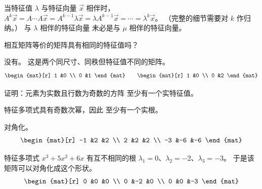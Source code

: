     \begin{answer}
      \begin{exparts}
        \partsitem 当特征值 $\lambda$ 与特征向量 $\vec{x}$ 相伴时，
          $A^k\vec{x}=A\cdots A\vec{x}=A^{k-1}\lambda\vec{x}
            =\lambda A^{k-1}\vec{x}=\cdots=\lambda^k\vec{x}$。
          （完整的细节需要对 $k$ 作归纳。）
        \partsitem 与 $\lambda$ 相伴的特征向量
          未必是与 $\mu$ 相伴的特征向量。
      \end{exparts}
    \end{answer}
  \item 
    相互矩阵等价的矩阵具有相同的特征值吗？
    \begin{answer}
      没有。
      这是两个同尺寸、同秩但特征值不同的矩阵。
      \begin{equation*}
        \begin{mat}[r]
          1  &0  \\
          0  &1
        \end{mat}
        \qquad
        \begin{mat}[r]
          1  &0  \\
          0  &2
        \end{mat}
      \end{equation*}
    \end{answer}
  \item 
    证明：元素为实数且行数为奇数的方阵
    至少有一个实特征值。
    \begin{answer}
      特征多项式具有奇数次幂，因此
      至少有一个实根。
    \end{answer}
  \item 
    对角化。
    \begin{equation*}
       \begin{mat}[r]
         -1  &2  &2  \\
          2  &2  &2  \\
         -3  &-6 &-6
       \end{mat}
    \end{equation*}
    \begin{answer}
      特征多项式 $x^3+5x^2+6x$ 有互不相同的根
      \( \lambda_1=0 \)、\( \lambda_2=-2 \)、\( \lambda_3=-3 \)。
      于是该矩阵可以对角化成这个形状。
      \begin{equation*}
         \begin{mat}[r]
            0  &0  &0  \\
            0  &-2 &0  \\
            0  &0  &-3
         \end{mat}
      \end{equation*}    
    \end{answer}
